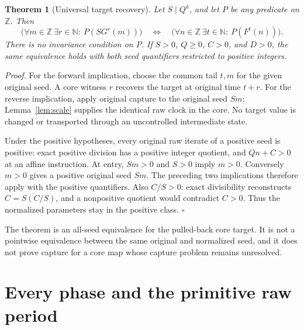 \documentclass[11pt,letterpaper]{article}
\newcommand{\N}{\mathbb{N}}
\newcommand{\Z}{\mathbb{Z}}
\newtheorem{theorem}{Theorem}
\newenvironment{proof}{\noindent\textit{Proof.}}{\hfill\(\square\)}
\begin{document}
\begin{theorem}[Universal target recovery]
\label{thm:targets}
Let \(S\mid Q^k\), and let \(P\) be any predicate on \(\Z\). Then
\[
\bigl(\forall m\in\Z\ \exists r\in\N:\ P(SG^r(m))\bigr)
\quad\Longleftrightarrow\quad
\bigl(\forall n\in\Z\ \exists t\in\N:\ P(F^t(n))\bigr).
\]
There is no invariance condition on \(P\).
If \(S>0\), \(Q\ge0\), \(C>0\), and \(D>0\), the same equivalence
holds with both seed quantifiers restricted to positive integers.
\end{theorem}
\begin{proof}
For the forward implication, choose the common tail \(t,m\) for the given
original seed. A core witness \(r\) recovers the target at original time
\(t+r\). For the reverse implication, apply original capture to the
original seed \(Sm\); Lemma~\ref{lem:scale} supplies the identical raw
clock in the core. No target value is changed or transported through an
uncontrolled intermediate state.

Under the positive hypotheses, every original raw iterate of a positive
seed is positive: exact positive division has a positive integer quotient,
and \(Qn+C>0\) at an affine instruction. At entry, \(Sm>0\) and \(S>0\)
imply \(m>0\). Conversely \(m>0\) gives a positive original seed \(Sm\).
The preceding two implications therefore apply with the positive quantifiers.
Also \(C/S>0\): exact divisibility reconstructs \(C=S(C/S)\), and a
nonpositive quotient would contradict \(C>0\). Thus the normalized
parameters stay in the positive class.
\end{proof}

The theorem is an all-seed equivalence for the pulled-back core target.
It is not a pointwise equivalence between the same original and normalized
seed, and it does not prove capture for a core map whose capture problem
remains unresolved.

\section{Every phase and the primitive raw period}
\end{document}
